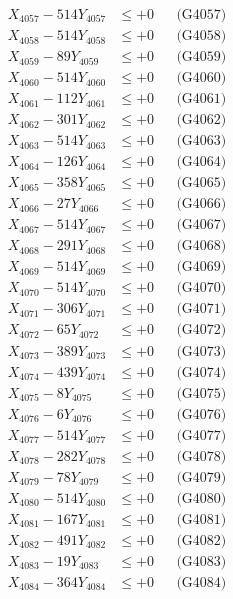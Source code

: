 \documentclass[a4paper,10pt]{article}
\begin{document}
{\begin{align}
X_{4057} - 514Y_{4057} &\leq +0 && \text{(G4057)} \\
X_{4058} - 514Y_{4058} &\leq +0 && \text{(G4058)} \\
X_{4059} - 89Y_{4059} &\leq +0 && \text{(G4059)} \\
X_{4060} - 514Y_{4060} &\leq +0 && \text{(G4060)} \\
\allowbreak
X_{4061} - 112Y_{4061} &\leq +0 && \text{(G4061)} \\
X_{4062} - 301Y_{4062} &\leq +0 && \text{(G4062)} \\
X_{4063} - 514Y_{4063} &\leq +0 && \text{(G4063)} \\
X_{4064} - 126Y_{4064} &\leq +0 && \text{(G4064)} \\
X_{4065} - 358Y_{4065} &\leq +0 && \text{(G4065)} \\
X_{4066} - 27Y_{4066} &\leq +0 && \text{(G4066)} \\
X_{4067} - 514Y_{4067} &\leq +0 && \text{(G4067)} \\
X_{4068} - 291Y_{4068} &\leq +0 && \text{(G4068)} \\
X_{4069} - 514Y_{4069} &\leq +0 && \text{(G4069)} \\
X_{4070} - 514Y_{4070} &\leq +0 && \text{(G4070)} \\
\allowbreak
X_{4071} - 306Y_{4071} &\leq +0 && \text{(G4071)} \\
X_{4072} - 65Y_{4072} &\leq +0 && \text{(G4072)} \\
X_{4073} - 389Y_{4073} &\leq +0 && \text{(G4073)} \\
X_{4074} - 439Y_{4074} &\leq +0 && \text{(G4074)} \\
X_{4075} - 8Y_{4075} &\leq +0 && \text{(G4075)} \\
X_{4076} - 6Y_{4076} &\leq +0 && \text{(G4076)} \\
X_{4077} - 514Y_{4077} &\leq +0 && \text{(G4077)} \\
X_{4078} - 282Y_{4078} &\leq +0 && \text{(G4078)} \\
X_{4079} - 78Y_{4079} &\leq +0 && \text{(G4079)} \\
X_{4080} - 514Y_{4080} &\leq +0 && \text{(G4080)} \\
\allowbreak
X_{4081} - 167Y_{4081} &\leq +0 && \text{(G4081)} \\
X_{4082} - 491Y_{4082} &\leq +0 && \text{(G4082)} \\
X_{4083} - 19Y_{4083} &\leq +0 && \text{(G4083)} \\
X_{4084} - 364Y_{4084} &\leq +0 && \text{(G4084)} \\

\end{align}}
\end{document}
